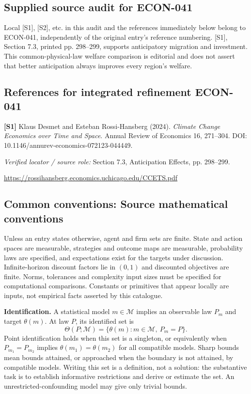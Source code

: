 \documentclass[11pt,a4paper]{article}
\begin{document}
\subsection*{Supplied source audit for ECON-041}
Local [S1], [S2], etc. in this audit and the references immediately below
belong to ECON-041, independently of the original entry's reference numbering.
[S1], Section 7.3, printed pp. 298--299, supports anticipatory migration and investment. This common-physical-law welfare comparison is editorial and does not assert that better anticipation always improves every region's welfare.
\subsection*{References for integrated refinement ECON-041}
{\footnotesize\raggedright
\par\noindent\textbf{[S1]} Klaus Desmet and Esteban Rossi-Hansberg (2024). \emph{Climate Change Economics over Time and Space}. Annual Review of Economics 16, 271–304. DOI: 10.1146/annurev-economics-072123-044449.\par \textit{Verified locator / source role:} Section 7.3, Anticipation Effects, pp. 298–299.\par \url{https://rossihansberg.economics.uchicago.edu/CCETS.pdf}\par\smallskip
}

\subsection*{Common conventions: Source mathematical conventions}

Unless an entry states otherwise, agent and firm sets are finite. State and action spaces are measurable, strategies and outcome maps are measurable, probability laws are specified, and expectations exist for the targets under discussion. Infinite-horizon discount factors lie in $(0,1)$ and discounted objectives are finite. Norms, tolerances and complexity input sizes must be specified for computational comparisons. Constants or primitives that appear locally are inputs, not empirical facts asserted by this catalogue.

\textbf{Identification.} A statistical model $m\in\mathcal M$ implies an observable law $P_m$ and target $\theta(m)$. At law $P$, its identified set is
\[
\Theta(P;\mathcal M)=\{\theta(m):m\in\mathcal M,\ P_m=P\}.
\]
Point identification holds when this set is a singleton, or equivalently when $P_{m_1}=P_{m_2}$ implies $\theta(m_1)=\theta(m_2)$ for all compatible models. Sharp bounds mean bounds attained, or approached when the boundary is not attained, by compatible models. Writing this set is a definition, not a solution: the substantive task is to establish informative restrictions and derive or estimate the set. An unrestricted-confounding model may give only trivial bounds.
\end{document}
